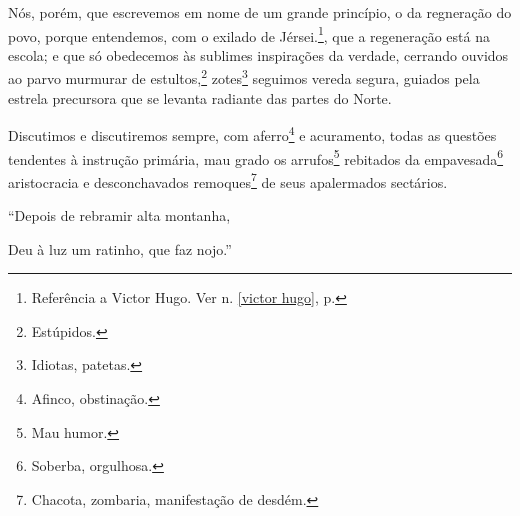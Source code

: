 Nós, porém, que escrevemos em nome de um grande princípio, o da
regneração do povo, porque entendemos, com o exilado de
Jérsei.\footnote{Referência a Victor Hugo. Ver n. \ref{victor hugo}, 
p. \pageref{victor hugo}}, que a regeneração está na escola; e que só 
obedecemos às sublimes inspirações da verdade, cerrando ouvidos ao 
parvo murmurar de estultos,\footnote{Estúpidos.} zotes\footnote{Idiotas, 
patetas.} seguimos vereda segura, guiados pela estrela precursora que 
se levanta radiante das partes do Norte.

Discutimos e discutiremos sempre, com aferro\footnote{Afinco,
  obstinação.} e acuramento, todas as questões tendentes à instrução
primária, mau grado os arrufos\footnote{Mau humor.} rebitados da
empavesada\footnote{Soberba, orgulhosa.} aristocracia e desconchavados
remoques\footnote{Chacota, zombaria, manifestação de desdém.} de seus
apalermados sectários.

``Depois de rebramir alta montanha,

Deu à luz um ratinho, que faz nojo.''

